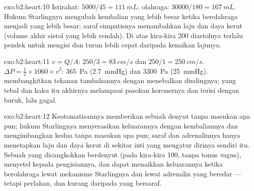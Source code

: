 \begin{solution}{exo:b2:heart:10}
Istirahat: $5000/45 = \qty{111}{mL}$; olahraga: $\num{30000}/180 =
\qty{167}{mL}$. Hukum Starlingnya mengubah kembalian  yang lebih
besar ketika berolahraga menjadi  yang lebih besar;
saraf simpatisnya menambahkan laju dan daya kerut (volume akhir sistol
yang lebih rendah). Di atas kira-kira 200 diastolnya terlalu pendek
untuk mengisi  dan  turun lebih cepat
daripada kenaikan lajunya.
\end{solution}

\begin{solution}{exo:b2:heart:11}
$v = Q/A$: $250/3 = \qty{83}{cm/s}$ dan $250/1 = \qty{250}{cm/s}$.
$\Delta P = \tfrac12\times 1060\times v^{2}$: \qty{365}{Pa}
(\qty{2.7}{mmHg}) dan \qty{3300}{Pa} (\qty{25}{mmHg}). 
membangkitkan tekanan tambahannya dengan menebalkan dindingnya; 
yang tebal dan kaku itu akhirnya melampaui pasokan koronernya dan
terisi dengan buruk, lalu gagal.
\end{solution}

\begin{solution}{exo:b2:heart:12}
Keotomatisannya memberikan sebuah denyut tanpa masukan apa pun; hukum
Starlingnya menyerasikan keluarannya dengan kembaliannya dan
mengimbangkan kedua  tanpa masukan apa pun; saraf dan
adrenalinnya hanya menetapkan laju dan daya kerut di sekitar inti yang
mengatur dirinya sendiri itu. Sebuah  yang dicangkokkan
berdenyut (pada kira-kira 100, tanpa tonus vagus), menyetel  kepada pengisiannya, dan dapat menaikkan keluarannya ketika
berolahraga lewat mekanisme Starlingnya dan lewat adrenalin yang
beredar --- tetapi perlahan, dan kurang daripada  yang bersaraf.
\end{solution}

